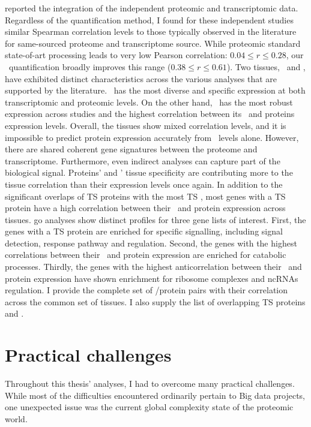  reported
the integration of the independent proteomic and transcriptomic data.
Regardless of the quantification method,
I found for these independent studies
similar Spearman correlation levels
to those typically observed in the literature
for same-sourced proteome and transcriptome source.
While proteomic standard state-of-art processing leads
to very low Pearson correlation: $0.04 ≤ r ≤ 0.28$,
our \PPKM\ quantification broadly improves this range ($0.38 ≤ r ≤ 0.61$).
Two tissues, \Testis\ and \Liver,
have exhibited distinct characteristics across the various analyses
that are supported by the literature.
\Testis\ has the most diverse and specific expression
at both transcriptomic and proteomic levels.
On the other hand, \Liver\ has the most robust expression across studies
and the highest correlation between its \mRNAs\ and proteins expression levels.
Overall, the tissues show mixed correlation levels,
and it is impossible to predict protein expression accurately
from \mRNA\ levels alone.
However, there are shared coherent gene signatures
between the proteome and transcriptome.
Furthermore, even indirect analyses can capture part of the biological signal.
Proteins' and \mRNAs{}' tissue specificity are contributing
more to the tissue correlation than their expression levels once again.
In addition to the significant overlaps of \gls{TS} proteins
with the most \gls{TS} \mRNAs,
most genes with a \gls{TS} protein have
a high correlation between their \mRNA\ and protein expression across tissues.
\gls{go} analyses show distinct profiles for three gene lists of interest.
First, the genes with a \gls{TS} protein
are enriched for specific signalling,
including signal detection, response pathway and regulation.
Second, the genes with the highest correlations
between their \mRNA\ and protein expression
are enriched for catabolic processes.
Thirdly, the genes with the highest anticorrelation
between their \mRNA\ and protein expression
have shown enrichment for ribosome complexes and \glspl{ncRNA} regulation.
I provide the complete set of \mRNA/protein pairs with their correlation
across the common set of tissues.
I also supply the list of overlapping \gls{TS} proteins and \mRNAs{}.\mybr\

\section*{Practical challenges}
Throughout this thesis' analyses,
I had to overcome many practical challenges.
While most of the difficulties encountered ordinarily pertain to Big data projects,
one unexpected issue was
the current global complexity state of the proteomic world.\mybr\


